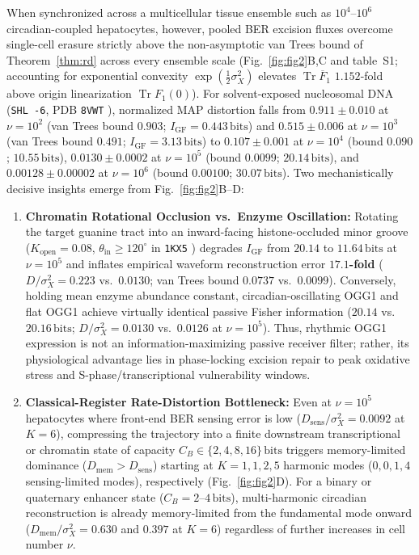 \documentclass[10pt,letterpaper]{article}
\theoremstyle{plain}
\theoremstyle{definition}
\newcommand{\Tr}{\operatorname{Tr}}
\begin{document}
When synchronized across a multicellular tissue ensemble such as $10^4$--$10^6$ circadian-coupled hepatocytes, however, pooled BER excision fluxes overcome single-cell erasure strictly above the non-asymptotic van Trees bound of Theorem~\ref{thm:rd} across every ensemble scale (Fig.~\ref{fig:fig2}B,C and table~S1; accounting for exponential convexity $\exp(\frac{1}{2}\sigma_X^2)$ elevates $\Tr\overline{F}_1$ $1.152$-fold above origin linearization $\Tr F_1(0)$). For solvent-exposed nucleosomal DNA (\texttt{SHL -6}, PDB \texttt{8VWT} \cite{cordero2024natcommun}), normalized MAP distortion falls from $0.911 \pm 0.010$ at $\nu = 10^2$ (van Trees bound $0.903$; $I_{\mathrm{GF}} = 0.443\,\mathrm{bits}$) and $0.515 \pm 0.006$ at $\nu = 10^3$ (van Trees bound $0.491$; $I_{\mathrm{GF}} = 3.13\,\mathrm{bits}$) to $0.107 \pm 0.001$ at $\nu = 10^4$ (bound $0.090$; $10.55\,\mathrm{bits}$), $0.0130 \pm 0.0002$ at $\nu = 10^5$ (bound $0.0099$; $20.14\,\mathrm{bits}$), and $0.00128 \pm 0.00002$ at $\nu = 10^6$ (bound $0.00100$; $30.07\,\mathrm{bits}$). Two mechanistically decisive insights emerge from Fig.~\ref{fig:fig2}B--D:
\begin{enumerate}[leftmargin=1.8em,itemsep=2pt]
    \item \textbf{Chromatin Rotational Occlusion vs.\ Enzyme Oscillation:} Rotating the target guanine tract into an inward-facing histone-occluded minor groove ($K_{\mathrm{open}} = 0.08$, $\theta_{\mathrm{in}} \ge 120^\circ$ in \texttt{1KX5} \cite{cordero2024natcommun,ren2024natcommun}) degrades $I_{\mathrm{GF}}$ from $20.14$ to $11.64\,\mathrm{bits}$ at $\nu = 10^5$ and inflates empirical waveform reconstruction error \textbf{$17.1$-fold} ($D/\sigma_X^2 = 0.223$ vs.\ $0.0130$; van Trees bound $0.0737$ vs.\ $0.0099$). Conversely, holding mean enzyme abundance constant, circadian-oscillating OGG1 and flat OGG1 achieve virtually identical passive Fisher information ($20.14$ vs.\ $20.16\,\mathrm{bits}$; $D/\sigma_X^2 = 0.0130$ vs.\ $0.0126$ at $\nu = 10^5$). Thus, rhythmic OGG1 expression is not an information-maximizing passive receiver filter; rather, its physiological advantage lies in phase-locking excision repair to peak oxidative stress and S-phase/transcriptional vulnerability windows.
    \item \textbf{Classical-Register Rate-Distortion Bottleneck:} Even at $\nu = 10^5$ hepatocytes where front-end BER sensing error is low ($D_{\mathrm{sens}}/\sigma_X^2 = 0.0092$ at $K=6$), compressing the trajectory into a finite downstream transcriptional or chromatin state of capacity $C_B \in \{2, 4, 8, 16\}\,\mathrm{bits}$ triggers memory-limited dominance ($D_{\mathrm{mem}} > D_{\mathrm{sens}}$) starting at $K = 1, 1, 2, 5$ harmonic modes ($0, 0, 1, 4$ sensing-limited modes), respectively (Fig.~\ref{fig:fig2}D). For a binary or quaternary enhancer state ($C_B = 2$--$4\,\mathrm{bits}$), multi-harmonic circadian reconstruction is already memory-limited from the fundamental mode onward ($D_{\mathrm{mem}}/\sigma_X^2 = 0.630$ and $0.397$ at $K=6$) regardless of further increases in cell number $\nu$.
\end{enumerate}
\end{document}
